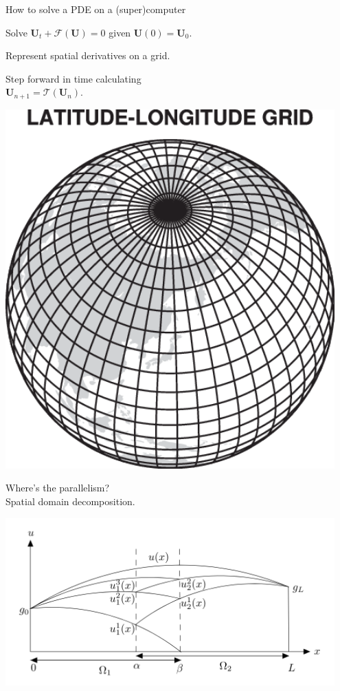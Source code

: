 \documentclass{beamer}
\def\MM#1{\boldsymbol{#1}}
\newenvironment{packed_itemize}{
\begin{itemize}[leftmargin=0.1in]
  \setlength{\itemsep}{1pt}
  \setlength{\parskip}{0pt}
  \setlength{\parsep}{0pt}
}{\end{itemize}}
\begin{document}
\begin{frame}{How to solve a PDE on a (super)computer}
  \begin{minipage}{0.65\textwidth}
    \small
    \begin{packed_itemize}
    \item[] Solve $\MM{U}_t + \mathcal{F}(\MM{U}) = 0$ given $\MM{U}(0) =
    \MM{U}_0$.
    \item[]Represent spatial derivatives on a grid.
    \item[]Step forward in time calculating \\$\MM{U}_{n+1} = \mathcal{T}(\MM{U}_n)$.
    \end{packed_itemize}
  \end{minipage}
  \begin{minipage}{0.3\textwidth}
    \vspace{0.1cm}
    \centerline{\includegraphics[width=0.95\textwidth]{figures/latlon.png}}
  \end{minipage}
  Where's the parallelism? \\ Spatial domain decomposition.
  \centerline{\includegraphics[width=0.95\textwidth]{figures/DD.png}}
\end{frame}
\end{document}
